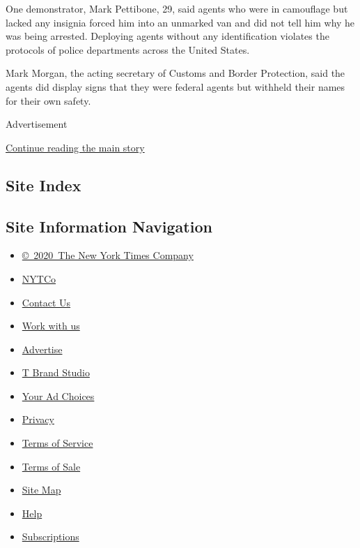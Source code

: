 One demonstrator, Mark Pettibone, 29, said agents who were in camouflage
but lacked any insignia forced him into an unmarked van and did not tell
him why he was being arrested. Deploying agents without any
identification violates the protocols of police departments across the
United States.

Mark Morgan, the acting secretary of Customs and Border Protection, said
the agents did display signs that they were federal agents but withheld
their names for their own safety.

Advertisement

\protect\hyperlink{after-bottom}{Continue reading the main story}

\hypertarget{site-index}{%
\subsection{Site Index}\label{site-index}}

\hypertarget{site-information-navigation}{%
\subsection{Site Information
Navigation}\label{site-information-navigation}}

\begin{itemize}
\tightlist
\item
  \href{https://help.nytimes.com/hc/en-us/articles/115014792127-Copyright-notice}{©~2020~The
  New York Times Company}
\end{itemize}

\begin{itemize}
\tightlist
\item
  \href{https://www.nytco.com/}{NYTCo}
\item
  \href{https://help.nytimes.com/hc/en-us/articles/115015385887-Contact-Us}{Contact
  Us}
\item
  \href{https://www.nytco.com/careers/}{Work with us}
\item
  \href{https://nytmediakit.com/}{Advertise}
\item
  \href{http://www.tbrandstudio.com/}{T Brand Studio}
\item
  \href{https://www.nytimes.com/privacy/cookie-policy\#how-do-i-manage-trackers}{Your
  Ad Choices}
\item
  \href{https://www.nytimes.com/privacy}{Privacy}
\item
  \href{https://help.nytimes.com/hc/en-us/articles/115014893428-Terms-of-service}{Terms
  of Service}
\item
  \href{https://help.nytimes.com/hc/en-us/articles/115014893968-Terms-of-sale}{Terms
  of Sale}
\item
  \href{https://spiderbites.nytimes.com}{Site Map}
\item
  \href{https://help.nytimes.com/hc/en-us}{Help}
\item
  \href{https://www.nytimes.com/subscription?campaignId=37WXW}{Subscriptions}
\end{itemize}

